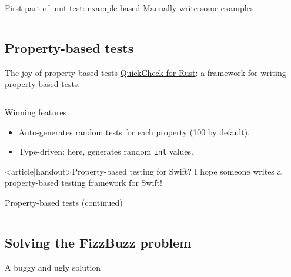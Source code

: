 \begin{frame}[fragile]{First part of \alert{unit test}: example-based}
  Manually write some \alert{examples}.

  \inputminted[gobble=2]{rust}{FizzBuzzSpec1.rs}
\end{frame}

\subsection{Property-based tests}

\begin{frame}[fragile]{The joy of property-based tests}
  \href{https://github.com/BurntSushi/quickcheck/}{QuickCheck for Rust}: a framework for writing \alert{property-based} tests.

  \inputminted[gobble=2]{rust}{FizzBuzzSpec2.rs}

  \begin{block}{Winning features}
    \begin{itemize}
    \item Auto-generates \alert{random} tests for each property (100 by default).
    \item \alert{Type-driven}: here, generates random \texttt{int} values.
    \end{itemize}
  \end{block}
\end{frame}

\begin{frame}<article|handout>{Property-based testing for Swift?}
  I hope someone writes a property-based testing framework for Swift!
\end{frame}

\begin{frame}[fragile]{Property-based tests (continued)}
  \inputminted[gobble=2]{rust}{FizzBuzzSpec3.rs}
\end{frame}

\subsection{Solving the FizzBuzz problem}

\begin{frame}[fragile]{A buggy and ugly solution}
  \inputminted[gobble=2]{rust}{FizzBuzzIf.rs}

  \inputminted{console}{testQuick3.console}
\end{frame}

